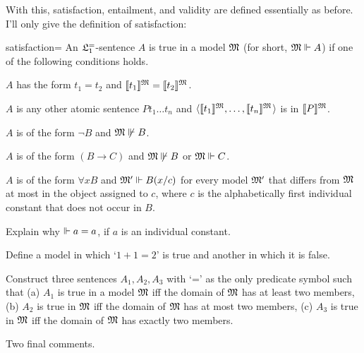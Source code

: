 With this,
satisfaction, entailment, and validity are defined essentially as before.
I'll only give the definition of satisfaction:

\begin{definition}{}{satisfaction=}
  An $\mathfrak{L}_{1}^{=}$-sentence $A$ is true in a model $\mathfrak{M}$ (for short, $\mathfrak{M} \Vdash A$)
  if one of the following conditions holds.
  \begin{enumerate*}
    \item[(i)] $A$ has the form $t_{1} = t_{2}$ and $\llbracket t_{1} \rrbracket^{\mathfrak{M}} = \llbracket t_{2} \rrbracket^{\mathfrak{M}}$.
    \item[(ii)] $A$ is any other atomic sentence $Pt_{1}\ldots t_{n}$ and
       $\t{\llbracket t_{1}\rrbracket^{\Mod{M}},\ldots,\llbracket t_{n}\rrbracket^{\Mod{M}}}$ is in $\llbracket P \rrbracket^{\mathfrak{M}}$.
    \item[(iii)] $A$ is of the form $\neg B$ and $\mathfrak{M} \not\Vdash B$.
    \item[(iv)] $A$ is of the form $(B \to C)$ and $\mathfrak{M} \not\Vdash B$ or $\mathfrak{M} \Vdash C$.
    \item[(v)] $A$ is of the form $\forall x B$ and $\mathfrak{M}' \Vdash B(x/c)$ for every
      model $\mathfrak{M}'$ that differs from $\mathfrak{M}$ at most in the object assigned to $c$,
      where $c$ is the alphabetically first individual constant that does not occur in $B$.
  \end{enumerate*}
\end{definition}

\begin{exercise}
  Explain why $\Vdash a=a$, if $a$ is an individual constant.
\end{exercise}

\begin{exercise}
  Define a model in which `$1+1=2$' is true and another in which it is false.
\end{exercise}

\begin{exercise}\label{ex:domain-size}
  Construct three sentences $A_{1}, A_{2}, A_{3}$ with `=' as the only predicate symbol
  such that (a) $A_1$ is true in a model $\mathfrak{M}$ iff the domain of $\mathfrak{M}$ has at least two members, (b) $A_2$ is true in $\mathfrak{M}$ iff the domain of $\mathfrak{M}$ has at most two members, (c) $A_3$ is true in $\mathfrak{M}$ iff the domain of $\mathfrak{M}$ has exactly two members.
\end{exercise}

Two final comments.

